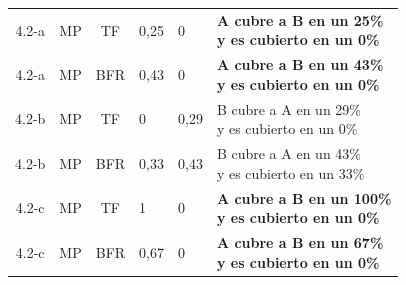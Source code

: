 \begin{itemize}
\begin{table}[h!]
\begin{tabular}{|c|c|c|l|l|l|}
4.2-a & MP & TF & 0,25 & 0 & \makecell{\textbf{A cubre a B en un 25\%} \\ \textbf{y es cubierto en un 0\%}} \\
4.2-a & MP & BFR & 0,43 & 0 & \makecell{\textbf{A cubre a B en un 43\%} \\ \textbf{ y es cubierto en un 0\% }}\\
4.2-b & MP & TF & 0 & 0,29 & \makecell{B cubre a A en un 29\% \\ y es cubierto en un 0\%} \\
4.2-b & MP & BFR & 0,33 & 0,43 & \makecell{B cubre a A en un 43\% \\ y es cubierto en un 33\%} \\
4.2-c & MP & TF & 1 & 0 & \makecell{\textbf{A cubre a B en un 100\%} \\ \textbf{ y es cubierto en un 0\% }}\\
4.2-c & MP & BFR & 0,67 & 0 & \makecell{\textbf{A cubre a B en un 67\%} \\ \textbf{ y es cubierto en un 0\%}} \\
\hline
    \end{tabular}
    \label{tab:frenteParetoNSFNET}
\end{table}

\end{itemize}





